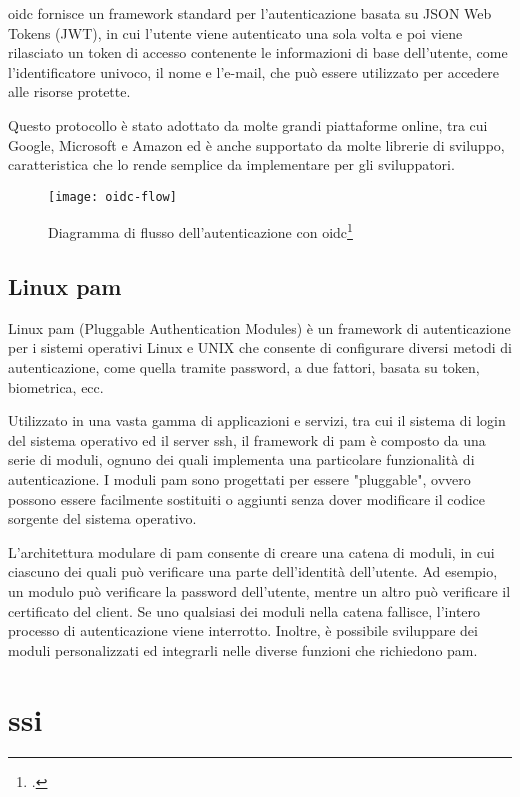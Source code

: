 \acrshort{oidc} fornisce un framework standard per l'autenticazione basata su JSON Web Tokens (JWT), in cui l'utente viene autenticato una sola volta e poi viene rilasciato un token di accesso contenente le informazioni di base dell'utente, come l'identificatore univoco, il nome e l'e-mail, che può essere utilizzato per accedere alle risorse protette.

Questo protocollo è stato adottato da molte grandi piattaforme online, tra cui Google, Microsoft e Amazon ed è anche supportato da molte librerie di sviluppo, caratteristica che lo rende semplice da implementare per gli sviluppatori.

\begin{figure}[!h] 
    \centering 
    \texttt{[image: oidc-flow]} 
    \caption{Diagramma di flusso dell'autenticazione con \acrshort{oidc}\footcite{site:oidc-flow-img}}
\end{figure}

\subsection{Linux \acrlong{pam}}
Linux \acrshort{pam} (Pluggable Authentication Modules) è un framework di autenticazione per i sistemi operativi Linux e UNIX che consente di configurare diversi metodi di autenticazione, come quella tramite password, a due fattori, basata su token, biometrica, ecc.

Utilizzato in una vasta gamma di applicazioni e servizi, tra cui il sistema di login del sistema operativo ed il server \acrshort{ssh}, il framework di \acrshort{pam} è composto da una serie di moduli, ognuno dei quali implementa una particolare funzionalità di autenticazione. I moduli \acrshort{pam} sono progettati per essere "pluggable", ovvero possono essere facilmente sostituiti o aggiunti senza dover modificare il codice sorgente del sistema operativo.

L'architettura modulare di \acrshort{pam} consente di creare una catena di moduli, in cui ciascuno dei quali può verificare una parte dell'identità dell'utente. Ad esempio, un modulo può verificare la password dell'utente, mentre un altro può verificare il certificato del client. Se uno qualsiasi dei moduli nella catena fallisce, l'intero processo di autenticazione viene interrotto. Inoltre, è possibile sviluppare dei moduli personalizzati ed integrarli nelle diverse funzioni che richiedono \acrshort{pam}.

\section{\acrlong{ssi}}

